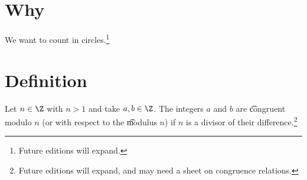 
\section*{Why}

We want to count in circles.\footnote{Future editions will expand.}

\section*{Definition}

Let $n \in \Z $ with $n > 1$ and take $a, b \in \Z $.
The integers $a$ and $b$ are \t{congruent modulo} $n$ (or with respect to the \t{modulus} $n$) if $n$ is a divisor of their difference.\footnote{Future editions will expand, and may need a sheet on congruence relations.}

\blankpage